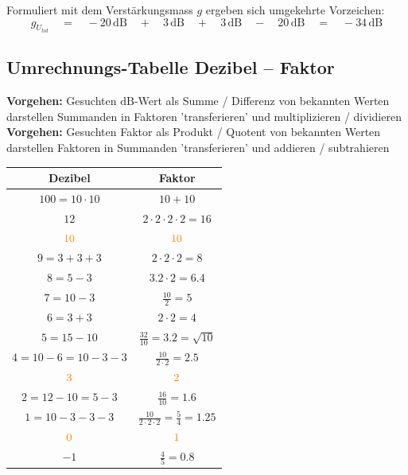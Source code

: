 Formuliert mit dem Verstärkungsmass $g$ ergeben sich umgekehrte Vorzeichen:
$$ g_{U_{tot}} \quad = \quad - 20 \, \mathrm{dB} \quad  + \quad 3 \, \mathrm{dB} \quad + 
    \quad 3 \, \mathrm{dB} \quad - \quad 20 \, \mathrm{dB} \quad = \quad -34 \, \mathrm{dB} $$



\subsection{Umrechnungs-Tabelle Dezibel -- Faktor}

\textbf{Vorgehen:} Gesuchten $\mathrm{dB}$-Wert als Summe / Differenz von bekannten Werten darstellen 
\textrightarrow Summanden in Faktoren 'transferieren' und multiplizieren / dividieren \\

\textbf{Vorgehen:} Gesuchten Faktor als Produkt / Quotent von bekannten Werten darstellen 
\textrightarrow Faktoren in Summanden 'transferieren' und addieren / subtrahieren \\


\begin{tabular}{ | c | c |}
    \toprule
    \textbf{Dezibel}        & \textbf{Faktor} \\
    \midrule
    $100 = 10 \cdot 10$     & $10 + 10$ \\ 
    $12$                    & $2 \cdot 2 \cdot 2 \cdot 2 = 16$ \\
    ${\color{orange}10}$              & ${\color{orange}10}$ \\
    $9 = 3 + 3 + 3$         & $2 \cdot 2 \cdot 2 = 8$ \\
    $8 = 5 - 3$             & $3.2 \cdot 2 = 6.4$ \\
    $7 = 10 -3$             & $\frac{10}{2} = 5$ \\
    $6 = 3 + 3$             & $2 \cdot 2 = 4$ \\
    $5 = 15 - 10$           & $\frac{32}{10} = 3.2 = \sqrt{10}$ \\
    $4 = 10 - 6 = 10 - 3-3$ & $\frac{10}{2 \cdot 2} = 2.5$ \\
    ${\color{orange}3}$               & ${\color{orange}2}$ \\
    $2= 12-10= 5-3$         & $\frac{16}{10} = 1.6$ \\
    $1 = 10 - 3 - 3 - 3$    & $\frac{10}{2\cdot 2 \cdot 2} = \frac{5}{4} = 1.25$ \\
    ${\color{orange}0}$               & ${\color{orange}1}$ \\
    $-1$                    & $\frac{4}{5} = 0.8$ \\
    \bottomrule
\end{tabular}


